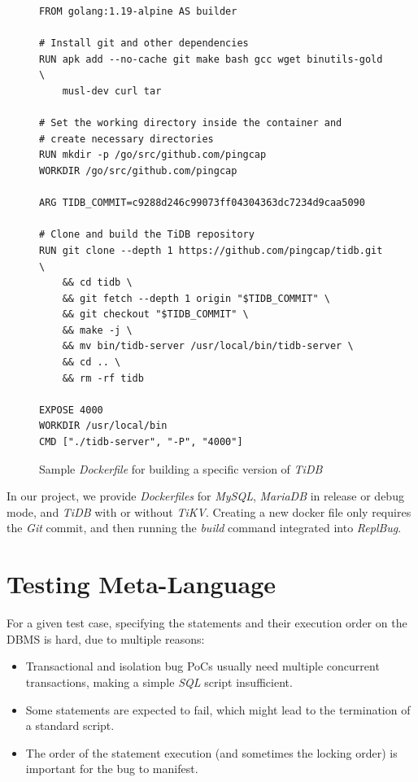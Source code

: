 \begin{figure}
\begin{verbatim}
FROM golang:1.19-alpine AS builder

# Install git and other dependencies
RUN apk add --no-cache git make bash gcc wget binutils-gold \
    musl-dev curl tar

# Set the working directory inside the container and
# create necessary directories
RUN mkdir -p /go/src/github.com/pingcap
WORKDIR /go/src/github.com/pingcap

ARG TIDB_COMMIT=c9288d246c99073ff04304363dc7234d9caa5090

# Clone and build the TiDB repository
RUN git clone --depth 1 https://github.com/pingcap/tidb.git \
    && cd tidb \
    && git fetch --depth 1 origin "$TIDB_COMMIT" \
    && git checkout "$TIDB_COMMIT" \
    && make -j \
    && mv bin/tidb-server /usr/local/bin/tidb-server \
    && cd .. \
    && rm -rf tidb

EXPOSE 4000
WORKDIR /usr/local/bin
CMD ["./tidb-server", "-P", "4000"]    
\end{verbatim}
\caption{Sample \textit{Dockerfile} for building a specific version of \textit{TiDB}}
\label{fig:dockerfilesample}
\end{figure}

In our project, we provide \textit{Dockerfiles} for \textit{MySQL}, \textit{MariaDB} in release or debug mode, and \textit{TiDB} with or without \textit{TiKV}. Creating a new docker file only requires the \textit{Git} commit, and then running the \textit{build} command integrated into \textit{ReplBug}. 

\section{Testing Meta-Language}

For a given test case, specifying the statements and their execution order on the DBMS is hard, due to multiple reasons:
\begin{itemize}
    \item Transactional and isolation bug PoCs usually need multiple concurrent transactions, making a simple \textit{SQL} script insufficient.
    \item Some statements are expected to fail, which might lead to the termination of a standard script.
    \item The order of the statement execution (and sometimes the locking order) is important for the bug to manifest.
\end{itemize} 

